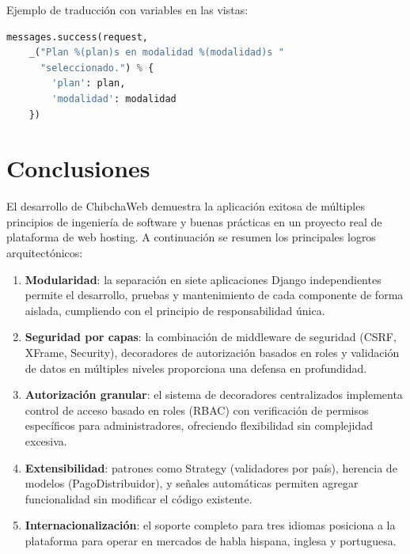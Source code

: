 \documentclass[12pt, a4paper]{article}
\begin{document}
{Ejemplo de traducción con variables en las vistas:

\begin{lstlisting}[language=Python, caption={Traducciones con variables en vistas}]
messages.success(request,
    _("Plan %(plan)s en modalidad %(modalidad)s "
      "seleccionado.") % {
        'plan': plan,
        'modalidad': modalidad
    })
\end{lstlisting}

\section{Conclusiones}

El desarrollo de ChibchaWeb demuestra la aplicación exitosa de múltiples principios de ingeniería de software y buenas prácticas en un proyecto real de plataforma de web hosting. A continuación se resumen los principales logros arquitectónicos:

\begin{enumerate}
    \item \textbf{Modularidad}: la separación en siete aplicaciones Django independientes permite el desarrollo, pruebas y mantenimiento de cada componente de forma aislada, cumpliendo con el principio de responsabilidad única.

    \item \textbf{Seguridad por capas}: la combinación de middleware de seguridad (CSRF, XFrame, Security), decoradores de autorización basados en roles y validación de datos en múltiples niveles proporciona una defensa en profundidad.

    \item \textbf{Autorización granular}: el sistema de decoradores centralizados implementa control de acceso basado en roles (RBAC) con verificación de permisos específicos para administradores, ofreciendo flexibilidad sin complejidad excesiva.

    \item \textbf{Extensibilidad}: patrones como Strategy (validadores por país), herencia de modelos (PagoDistribuidor), y señales automáticas permiten agregar funcionalidad sin modificar el código existente.

    \item \textbf{Internacionalización}: el soporte completo para tres idiomas posiciona a la plataforma para operar en mercados de habla hispana, inglesa y portuguesa.


\end{enumerate}}
\end{document}
